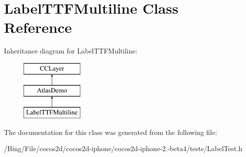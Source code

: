 \hypertarget{interface_label_t_t_f_multiline}{\section{Label\-T\-T\-F\-Multiline Class Reference}
\label{interface_label_t_t_f_multiline}
}
Inheritance diagram for Label\-T\-T\-F\-Multiline\-:\begin{figure}[H]
\begin{center}
\leavevmode
\includegraphics[height=3.000000cm]{interface_label_t_t_f_multiline}
\end{center}
\end{figure}


The documentation for this class was generated from the following file\-:\begin{DoxyCompactItemize}
\item 
/\-Bing/\-File/cocos2d/cocos2d-\/iphone/cocos2d-\/iphone-\/2.-\/beta4/tests/Label\-Test.\-h\end{DoxyCompactItemize}
